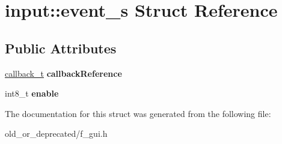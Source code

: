 \hypertarget{structinput_1_1event__s}{}\section{input\+::event\+\_\+s Struct Reference}
\label{structinput_1_1event__s}
\subsection*{Public Attributes}
\begin{DoxyCompactItemize}
\item 
\mbox{\label{structinput_1_1event__s_ae0568350c095285d9f2f7049b507d5a6}} 
\mbox{\hyperlink{unioninput_1_1callback__u}{callback\+\_\+t}} {\bfseries callback\+Reference}
\item 
\mbox{\label{structinput_1_1event__s_a74eb06c4517e367f20468a0c6365413a}} 
int8\+\_\+t {\bfseries enable}
\end{DoxyCompactItemize}


The documentation for this struct was generated from the following file\+:\begin{DoxyCompactItemize}
\item 
old\+\_\+or\+\_\+deprecated/f\+\_\+gui.\+h\end{DoxyCompactItemize}
